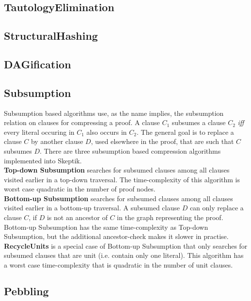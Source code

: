 \documentclass{llncs}
\begin{document}
\subsection{TautologyElimination}

\subsection{StructuralHashing}

\subsection{DAGification}

\subsection{Subsumption}

Subsumption based algorithms use, as the name implies, the subsumption relation on clauses for compressing a proof. A clause $C_1$ subsumes a clause $C_2$ \textit{iff} every literal occuring in $C_1$ also occurs in $C_2$.
The general goal is to replace a clause $C$ by another clause $D$, used elsewhere in the proof, that are such that $C$ subsumes $D$.
There are three subsumption based compression algorithms implemented into Skeptik.\\
\textbf{Top-down Subsumption} searches for subsumed clauses among all clauses visited earlier in a top-down traversal. The time-complexity of this algorithm is worst case quadratic in the number of proof nodes.\\
\textbf{Bottom-up Subsumption} searches for subsumed clauses among all clauses visited earlier in a bottom-up traversal. A subsumed clause $D$ can only replace a clause $C$, if $D$ is not an ancestor of $C$ in the graph representing the proof. Bottom-up Subsumption has the same time-complexity as Top-down Subsumption, but the additional ancestor-check makes it slower in practise.\\
\textbf{RecycleUnits} \cite{RP11} is a special case of Bottom-up Subsumption that only searches for subsumed clauses that are unit (i.e. contain only one literal). This algorithm has a worst case time-complexity that is quadratic in the number of unit clauses.

\subsection{Pebbling}
\end{document}
